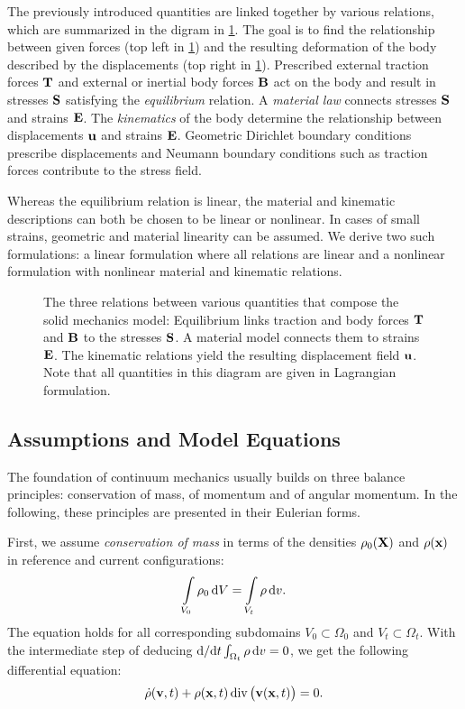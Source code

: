 The previously introduced quantities are linked together by various relations, which are summarized in the digram in \cref{fig:tonti_diagram}. The goal is to find the relationship between given forces (top left in \cref{fig:tonti_diagram}) and the resulting deformation of the body described by the displacements (top right in \cref{fig:tonti_diagram}).
Prescribed external traction forces $\textbf{T}$ and external or inertial body forces $\textbf{B}$ act on the body and result in stresses $\textbf{S}$ satisfying the \emph{equilibrium} relation. A \emph{material law} connects stresses $\textbf{S}$ and strains $\textbf{E}$. The \emph{kinematics} of the body determine the relationship between displacements $\textbf{u}$ and strains $\textbf{E}$. Geometric Dirichlet boundary conditions prescribe displacements and Neumann boundary conditions such as traction forces contribute to the stress field. 

Whereas the equilibrium relation is linear, the material and kinematic descriptions can both be chosen to be linear or nonlinear. 
In cases of small strains, geometric and material linearity can be assumed. We derive two such formulations: a linear formulation where all relations are linear and a nonlinear formulation with nonlinear material and kinematic relations.

\begin{figure}
  \centering%
  \def\svgwidth{\textwidth}
  \caption{The three relations between various quantities that compose the solid mechanics model: Equilibrium links traction and body forces $\textbf{T}$ and $\textbf{B}$ to the stresses $\textbf{S}$. A material model connects them to strains $\textbf{E}$. The kinematic relations yield the resulting displacement field $\textbf{u}$. Note that all quantities in this diagram are given in Lagrangian formulation.}%
  \label{fig:tonti_diagram}%
\end{figure}

\subsection{Assumptions and Model Equations}\label{sec:assumptions_and_model_equations}

The foundation of continuum mechanics usually builds on three balance principles: conservation of mass, of momentum and of angular momentum. In the following, these principles are presented in their Eulerian forms.

First, we assume \emph{conservation of mass} in terms of the densities $\rho_0(\textbf{X})$ and $\rho(\textbf{x})$ in reference and current configurations:
%
\begin{align*}
  \ds\int\limits_{V_0} \rho_0\,\d V = \int\limits_{V_t} \rho \,\d v.
\end{align*}
%
The equation holds for all corresponding subdomains $V_0\subset \Omega_0$ and $V_t \subset \Omega_t$. With the intermediate step of deducing $\d/\d t \int_{\Omega_t} \rho \,\d v=0$, we get the following differential equation:%
\begin{align}\label{eq:contraction_helper1}
  \dot{\rho}(\textbf{v},t) + \rho(\textbf{x},t)\,\hbox{div} \,\big(\textbf{v}(\textbf{x},t)\big) = 0.
\end{align}
%

